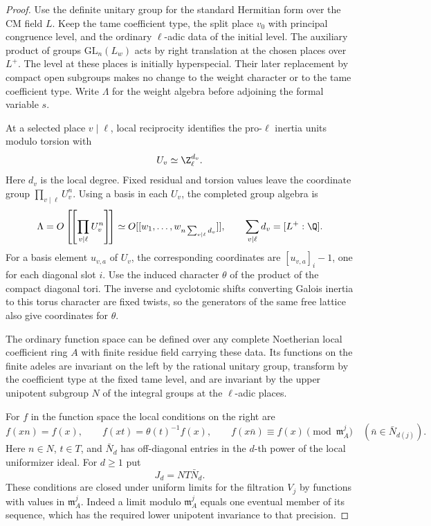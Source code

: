 \begin{proof}

Use the definite unitary group for the standard Hermitian
form over the CM field \(L\). Keep the tame coefficient
type, the split place \(v_0\) with principal congruence
level, and the ordinary \(\ell\)-adic data of the initial
level. The auxiliary product of groups \(\mathrm{GL}_n(L_w)\)
acts by right translation at the chosen places over
\(L^+\). The level at these places is initially
hyperspecial. Their later replacement by compact open
subgroups makes no change to the weight character or
to the tame coefficient type. Write \(\Lambda\) for the
weight algebra before adjoining the formal variable
\(s\).

At a selected place \(v\mid\ell\), local reciprocity identifies
the pro-\(\ell\) inertia units modulo torsion with
\[
                         U_v\simeq\Z_\ell^{d_v}.
\]
Here \(d_v\) is the local degree. Fixed residual and torsion
values leave the coordinate group \(\prod_{v\mid\ell}U_v^n\).
Using a basis in each \(U_v\), the completed group algebra is
\[
 \Lambda=O\left[\!\left[\prod_{v\mid\ell}U_v^n\right]\!\right]
       \simeq O[[w_1,\ldots,w_{n\sum_{v\mid\ell}d_v}]],
       \qquad \sum_{v\mid\ell}d_v=[L^+:\Q].
\]
For a basis element \(u_{v,a}\) of \(U_v\), the
corresponding coordinates are \([u_{v,a}]_i-1\), one for
each diagonal slot \(i\).
Use the induced character \(\theta\) of the product of
the compact diagonal tori. The inverse and cyclotomic
shifts converting Galois inertia to this torus character
are fixed twists, so the generators of the same free
lattice also give coordinates for \(\theta\).

The ordinary function space can be defined over any
complete Noetherian local coefficient ring \(A\) with
finite residue field carrying these data. Its functions
on the finite adeles are invariant on the left by the
rational unitary group, transform by the coefficient
type at the fixed tame level, and are invariant by the
upper unipotent subgroup \(N\) of the integral groups
at the \(\ell\)-adic places.

For \(f\) in the function space the local conditions on
the right are
\[
 f(xn)=f(x),\qquad f(xt)=\theta(t)^{-1}f(x),\qquad
 f(x\bar n)\equiv f(x)\pmod{\mathfrak m_A^j}
          \quad(\bar n\in\bar N_{d(j)}).
\]
Here \(n\in N\), \(t\in T\), and \(\bar N_d\) has off-diagonal
entries in the \(d\)-th power of the local uniformizer ideal. For
\(d\ge1\) put
\[
 J_d=N T\bar N_d.
\]
These conditions
are closed under uniform limits for the filtration
\(V_j\) by functions with values in \(\mathfrak m_A^j\).
Indeed a limit modulo \(\mathfrak m_A^j\) equals one
eventual member of its sequence, which has the required
lower unipotent invariance to that precision.


\end{proof}
